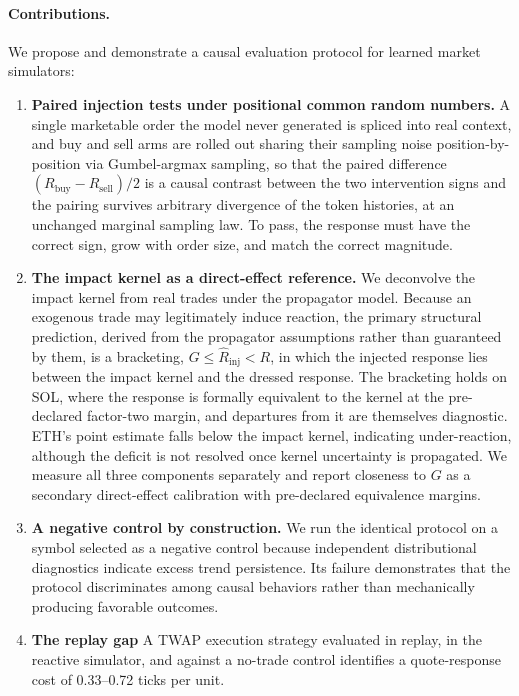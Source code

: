 \documentclass[11pt]{article}
\begin{document}
\paragraph{Contributions.} We propose and demonstrate a causal evaluation protocol for learned market simulators:

\begin{enumerate}
\item \textbf{Paired injection tests under positional common random numbers.} A single marketable order the model never generated is spliced into real context, and buy and sell arms are rolled out sharing their sampling noise position-by-position via Gumbel-argmax sampling, so that the paired difference $(R_{\mathrm{buy}}-R_{\mathrm{sell}})/2$ is a causal contrast between the two intervention signs and the pairing survives arbitrary divergence of the token histories, at an unchanged marginal sampling law. To pass, the response must have the correct sign, grow with order size, and match the correct magnitude.
\item \textbf{The impact kernel as a direct-effect reference.} We deconvolve the impact kernel from real trades under the propagator model. Because an exogenous trade may legitimately induce reaction, the primary structural prediction, derived from the propagator assumptions rather than guaranteed by them, is a bracketing, $G \le \hat{R}_{\mathrm{inj}} < R$, in which the injected response lies between the impact kernel and the dressed response. The bracketing holds on SOL, where the response is formally equivalent to the kernel at the pre-declared factor-two margin, and departures from it are themselves diagnostic. ETH's point estimate falls below the impact kernel, indicating under-reaction, although the deficit is not resolved once kernel uncertainty is propagated. We measure all three components separately and report closeness to $G$ as a secondary direct-effect calibration with pre-declared equivalence margins.
\item \textbf{A negative control by construction.} We run the identical protocol on a symbol selected as a negative control because independent distributional diagnostics indicate excess trend persistence. Its failure demonstrates that the protocol discriminates among causal behaviors rather than mechanically producing favorable outcomes.
\item \textbf{The replay gap} A TWAP execution strategy evaluated in replay, in the reactive simulator, and against a no-trade control identifies a quote-response cost of 0.33--0.72 ticks per unit.
\end{enumerate}
\end{document}
